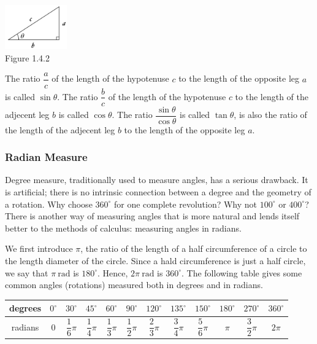 \documentclass[11pt]{book}
\theoremstyle{break}
\theoremstyle{no_label}
\newcommand{\figtag}[1]{\\[-1.2em]Figure {#1}}
\numberwithin{equation}{section}
\begin{document}
\begin{center}
    \includegraphics[width=0.2\textwidth]{triangle.JPG}\figtag{1.4.2}
\end{center}

The ratio $\dfrac{a}{c}$ of the length of the hypotenuse $c$ to the length of the opposite leg $a$ is called $\sin\theta$. The ratio $\dfrac{b}{c}$ of the length of the hypotenuse $c$ to the length of the adjecent leg $b$ is called $\cos\theta$. The ratio $\dfrac{\sin\theta}{\cos\theta}$ is called $\tan\theta$, is also the ratio of the length of the adjecent leg $b$ to the length of the opposite leg $a$.

\subsubsection*{Radian Measure}

Degree measure, traditionally used to measure angles, has a serious
drawback. It is artificial; there is no intrinsic connection between a degree and the geometry of a rotation. Why choose $360^\circ$ for one complete revolution? Why not $100^\circ$ or $400^\circ$? There is another way of measuring angles that is more natural and lends itself better to the methods of calculus: measuring angles in radians.

We first introduce $\pi$, the ratio of the length of a half circumference of a circle to the length diameter of the circle. Since a hald circumference is just a half circle, we say that $\pi\ \text{rad}$ is $180^\circ$. Hence, $2\pi\ \text{rad}$ is $360^\circ$. The following table gives some common angles (rotations) measured both in degrees and in radians.

\begin{center}
    \begin{tabular}{|cccccccccccc|}
        \hline
        degrees & $0^\circ$ & $30^\circ$ & $45^\circ$ & $60^\circ$ & $90^\circ$ & $120^\circ$ & $135^\circ$ & $150^\circ$ & $180^\circ$ & $270^\circ$ & $360^\circ$\\
        \hline
        radians & $0$ & $\dfrac{1}{6}\pi$ & $\dfrac{1}{4}\pi$ & $\dfrac{1}{3}\pi$ & $\dfrac{1}{2}\pi$ & $\dfrac{2}{3}\pi$ & $\dfrac{3}{4}\pi$ & $\dfrac{5}{6}\pi$ & $\pi$ & $\dfrac{3}{2}\pi$ & $2\pi$\\[0.2em]
        \hline
    \end{tabular}
\end{center}
\end{document}

